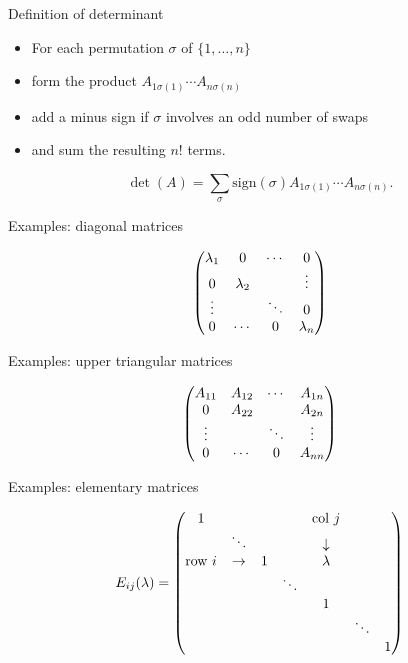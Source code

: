 \documentclass{beamer}
\begin{document}
\begin{frame}
{Definition of determinant}


\begin{Definition}[Determinant]\label{dfn:det}
\end{Definition}
\begin{itemize}
\item <1-> For each permutation \(\sigma\) of \(\{1,\ldots,n\}\)
\item <2-> form the product \(A_{1\sigma(1)}\cdots A_{n\sigma(n)}\)
\item <3-> add a minus sign if \(\sigma\) involves an odd number of
swaps
\item <4-> and sum the resulting \(n!\) terms.


\end{itemize}
\[\det(A)=\sum_{\sigma}\mathrm{sign}(\sigma)A_{1\sigma(1)}\cdots
A_{n\sigma(n)}.\]


\end{frame}
\begin{frame}
{Examples: diagonal matrices}


\[\begin{pmatrix} \lambda_1 & 0 & \cdots & 0\\ 0 & \lambda_2 & & \vdots
\\ \vdots & & \ddots & 0 \\ 0 & \cdots & 0 &\lambda_n\end{pmatrix}\]


\end{frame}
\begin{frame}
{Examples: upper triangular matrices}


\[\begin{pmatrix} A_{11} & A_{12} & \cdots & A_{1n}\\ 0 & A_{22} & & A_{2n}
\\ \vdots & & \ddots & \vdots \\ 0 & \cdots & 0 & A_{nn}\end{pmatrix}\]


\end{frame}
\begin{frame}
{Examples: elementary matrices}


\[E_{ij}(\lambda)=\begin{pmatrix} 1 & & & & \mbox{col }j & & \\ & \ddots & & &
\downarrow & & \\ \mbox{row }i&\rightarrow & 1 & & \lambda & &\\ & &
& \ddots & & & \\ & & & & 1 & & \\ & & & & & \ddots &\\ & & & & & &
1 \end{pmatrix}\]


\end{frame}
\end{document}
